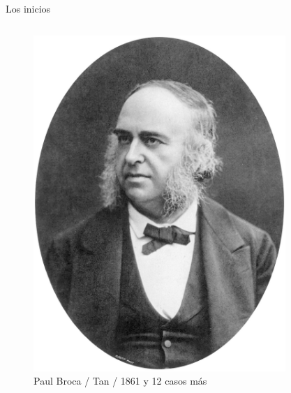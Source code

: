 \documentclass{beamer}
\begin{document}
\begin{frame}{Los inicios}
\transfade
\begin{columns}
\begin{column}{0.5\textwidth}
\begin{figure}
    \centering
    \includegraphics[width=0.8\linewidth]{Paul_Broca.jpg}
    \caption{Paul Broca / Tan / 1861 y 12 casos más}
\end{figure}
\end{column}
\begin{column}{0.5\textwidth}
\begin{figure}
    \centering

\end{figure}
\end{column}
\end{columns}
\end{frame}
\end{document}
